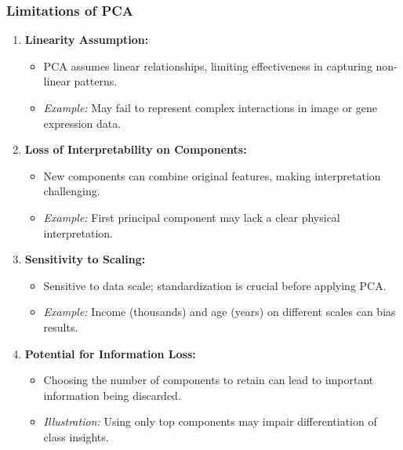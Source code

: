 \documentclass[aspectratio=169]{beamer}
\begin{document}
\begin{frame}[fragile]
    \frametitle{Limitations of PCA}
    \begin{enumerate}
        \item \textbf{Linearity Assumption:}
            \begin{itemize}
                \item PCA assumes linear relationships, limiting effectiveness in capturing non-linear patterns.
                \item \textit{Example:} May fail to represent complex interactions in image or gene expression data.
            \end{itemize}
        
        \item \textbf{Loss of Interpretability on Components:}
            \begin{itemize}
                \item New components can combine original features, making interpretation challenging.
                \item \textit{Example:} First principal component may lack a clear physical interpretation.
            \end{itemize}

        \item \textbf{Sensitivity to Scaling:}
            \begin{itemize}
                \item Sensitive to data scale; standardization is crucial before applying PCA.
                \item \textit{Example:} Income (thousands) and age (years) on different scales can bias results.
            \end{itemize}

        \item \textbf{Potential for Information Loss:}
            \begin{itemize}
                \item Choosing the number of components to retain can lead to important information being discarded.
                \item \textit{Illustration:} Using only top components may impair differentiation of class insights.
            \end{itemize}
    \end{enumerate}
\end{frame}
\end{document}
